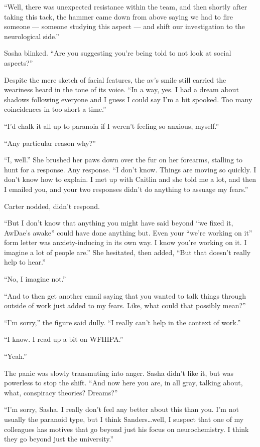 ``Well, there was unexpected resistance within the team, and then shortly after taking this tack, the hammer came down from above saying we had to fire someone — someone studying this aspect — and shift our investigation to the neurological side.''

Sasha blinked. ``Are you suggesting you're being told to not look at social aspects?''

Despite the mere sketch of facial features, the av's smile still carried the weariness heard in the tone of its voice. ``In a way, yes. I had a dream about shadows following everyone and I guess I could say I'm a bit spooked. Too many coincidences in too short a time.''

``I'd chalk it all up to paranoia if I weren't feeling so anxious, myself.''

``Any particular reason why?''

``I, well.'' She brushed her paws down over the fur on her forearms, stalling to hunt for a response. Any response. ``I don't know. Things are moving so quickly. I don't know how to explain. I met up with Caitlin and she told me a lot, and then I emailed you, and your two responses didn't do anything to assuage my fears.''

Carter nodded, didn't respond.

``But I don't know that anything you might have said beyond ``we fixed it, AwDae's awake'' could have done anything but. Even your ``we're working on it'' form letter was anxiety-inducing in its own way. I know you're working on it. I imagine a lot of people are.'' She hesitated, then added, ``But that doesn't really help to hear.''

``No, I imagine not.''

``And to then get another email saying that you wanted to talk things through outside of work just added to my fears. Like, what could that possibly mean?''

``I'm sorry,'' the figure said dully. ``I really can't help in the context of work.''

``I know. I read up a bit on WFHIPA.''

``Yeah.''

The panic was slowly transmuting into anger. Sasha didn't like it, but was powerless to stop the shift. ``And now here you are, in all gray, talking about, what, conspiracy theories? Dreams?''

``I'm sorry, Sasha. I really don't feel any better about this than you. I'm not usually the paranoid type, but I think Sanders\ldots{}well, I suspect that one of my colleagues has motives that go beyond just his focus on neurochemistry. I think they go beyond just the university.''

